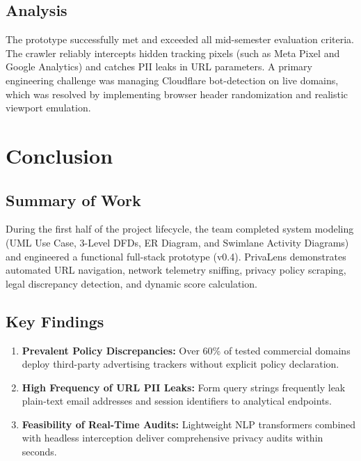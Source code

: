 \documentclass[12pt, a4paper, oneside]{report}
\begin{document}
\section{Analysis}
The prototype successfully met and exceeded all mid-semester evaluation criteria. The crawler reliably intercepts hidden tracking pixels (such as Meta Pixel and Google Analytics) and catches PII leaks in URL parameters. A primary engineering challenge was managing Cloudflare bot-detection on live domains, which was resolved by implementing browser header randomization and realistic viewport emulation.

\chapter{Conclusion}

\section{Summary of Work}
During the first half of the project lifecycle, the team completed system modeling (UML Use Case, 3-Level DFDs, ER Diagram, and Swimlane Activity Diagrams) and engineered a functional full-stack prototype (v0.4). PrivaLens demonstrates automated URL navigation, network telemetry sniffing, privacy policy scraping, legal discrepancy detection, and dynamic score calculation.

\section{Key Findings}
\begin{enumerate}
    \item \textbf{Prevalent Policy Discrepancies:} Over 60\% of tested commercial domains deploy third-party advertising trackers without explicit policy declaration.
    \item \textbf{High Frequency of URL PII Leaks:} Form query strings frequently leak plain-text email addresses and session identifiers to analytical endpoints.
    \item \textbf{Feasibility of Real-Time Audits:} Lightweight NLP transformers combined with headless interception deliver comprehensive privacy audits within seconds.
\end{enumerate}
\end{document}

